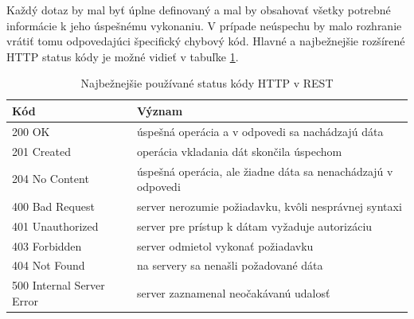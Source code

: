 Každý dotaz by mal byť úplne definovaný a mal by obsahovať všetky potrebné informácie k jeho úspešnému vykonaniu. V prípade neúspechu by malo rozhranie vrátiť tomu odpovedajúci špecifický chybový kód. Hlavné a najbežnejšie rozšírené HTTP status kódy je možné vidieť v tabuľke \ref{tab:rest-codes}.
\begin{table}[h]
\centering
\begin{tabular}{|l|l|}
\hline
Kód                       & Význam                                                                 \\ \hline
200 OK                    & úspešná operácia a v odpovedi sa nachádzajú dáta  \\ \hline
201 Created               & operácia vkladania dát skončila úspechom                               \\ \hline
204 No Content            & úspešná operácia, ale žiadne dáta sa nenachádzajú v odpovedi \\ \hline
400 Bad Request           & server nerozumie požiadavku, kvôli nesprávnej syntaxi                  \\ \hline
401 Unauthorized          & server pre prístup k dátam vyžaduje autorizáciu                        \\ \hline
403 Forbidden             & server odmietol vykonať požiadavku                                     \\ \hline
404 Not Found             & na servery sa nenašli požadované dáta                                  \\ \hline
500 Internal Server Error & server zaznamenal neočakávanú udalosť                                  \\ \hline
\end{tabular}
\caption{Najbežnejšie používané status kódy HTTP v REST}
\label{tab:rest-codes}
\end{table}